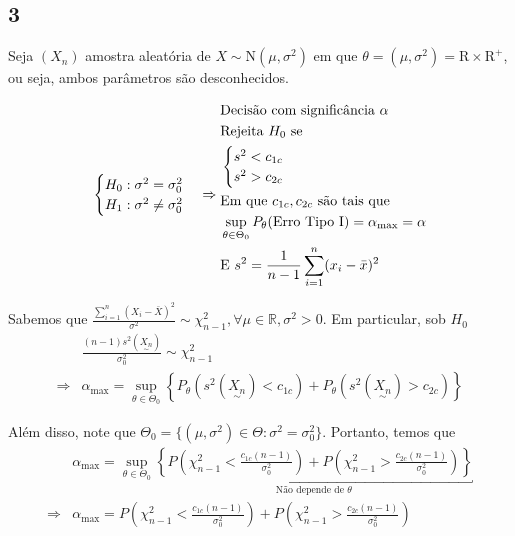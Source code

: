 \documentclass[
  letterpaper,
  DIV=11,
  numbers=noendperiod]{scrreprt}
\begin{document}
\subsection{3}\label{section-1}

Seja \((X_{n})\) amostra aleatória de
\(X \sim \mathrm{N}(\mu,\sigma^2)\) em que
\(\theta = (\mu, \sigma^2) = \mathrm{R} \times \mathrm{R}^+\), ou seja,
ambos parâmetros são desconhecidos.

\[
\begin{cases}
H_{0} : \sigma^2 = \sigma^2_{0} \\
H_{1}: \sigma^2 \neq \sigma^2_{0}
\end{cases} \Rightarrow 
\begin{aligned}
& \text{Decisão com significância } \alpha \\
&\text{Rejeita $H_{0}$ se} \\
&\begin{cases}
s^2 < c_{1c} \\
s^2 > c_{2c} \\
\end{cases} \\
& \text{Em que $c_{1c},c_{2c}$ são tais que} \\
& \sup_{\theta\in\Theta_{0}}P_{\theta}(\text{Erro Tipo I}) = \alpha_{\max} = \alpha \\
&\text{E } s^2 = \frac{1}{n-1} \sum^n_{i=1}(x_{i}-\bar{x})^2
\end{aligned} \\ \\
\]

Sabemos que
\(\frac{\sum_{i=1}^n(X_{i}-\bar{X})^2}{\sigma^2}\sim \chi^2_{n-1},\forall \mu \in \mathbb{R}, \sigma^2 > 0\).
Em particular, sob \(H_{0}\) \[
\begin{aligned}
&\frac{(n-1)s^2(\underset{\sim}{X_{n}})}{\sigma^2_{0}} \sim \chi^2_{n-1}
\\ \Rightarrow& \alpha_{\max} = \sup_{\theta \in \Theta_{0}}\left\{ P_{\theta}(s^2(\underset{\sim}{X_{n}}) < c_{1c}) +
P_{\theta}(s^2(\underset{\sim}{X_{n}})> c_{2c}) \right\} 
\end{aligned}
\]

Além disso, note que
\(\Theta_{0}=\{ (\mu,\sigma^2)\in \Theta:\sigma^2=\sigma^2_{0} \}\).
Portanto, temos que \[
\begin{aligned}
& \alpha_{\max} = \sup_{\theta \in \Theta_{0}} \underbracket{ \left\{  P\left( \chi^2_{n-1} < 
\frac{c_{1c}(n-1)}{\sigma^2_{0}}\right) + P\left( \chi^2_{n-1} > 
\frac{c_{2c}(n-1)}{\sigma^2_{0}} \right) \right\}}_{\text{Não depende de $\theta$}}\\
\Rightarrow & \alpha_{\max} =  P\left( \chi^2_{n-1} < \frac{c_{1c}(n-1)}{\sigma^2_{0}} \right) + P\left( \chi^2_{n-1} >
\frac{c_{2c}(n-1)}{\sigma^2_{0}} \right) 
\end{aligned}
\]
\end{document}
